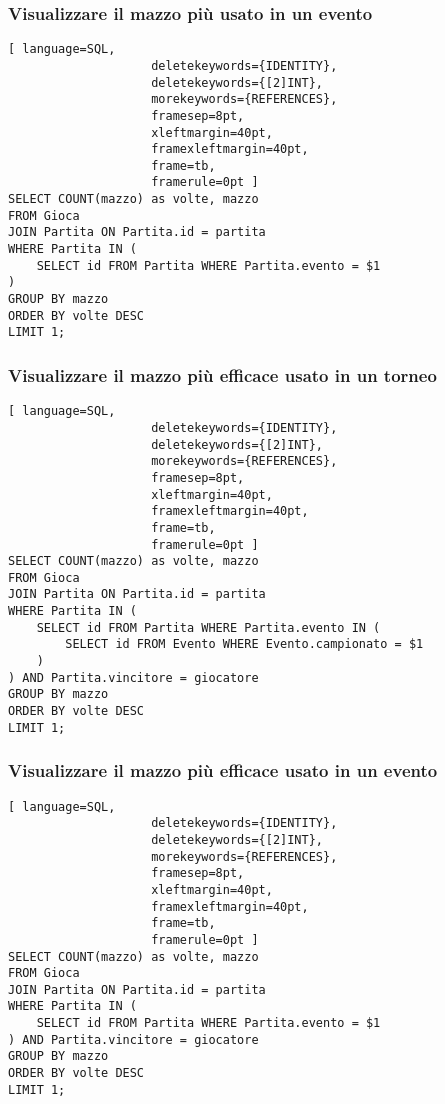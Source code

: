 \documentclass{article}
\begin{document}
\subsubsection{Visualizzare il mazzo più usato in un evento}
\begin{lstlisting}[ language=SQL,
                    deletekeywords={IDENTITY},
                    deletekeywords={[2]INT},
                    morekeywords={REFERENCES},
                    framesep=8pt,
                    xleftmargin=40pt,
                    framexleftmargin=40pt,
                    frame=tb,
                    framerule=0pt ]
SELECT COUNT(mazzo) as volte, mazzo
FROM Gioca 
JOIN Partita ON Partita.id = partita 
WHERE Partita IN (
    SELECT id FROM Partita WHERE Partita.evento = $1
) 
GROUP BY mazzo 
ORDER BY volte DESC 
LIMIT 1;
\end{lstlisting}

\subsubsection{Visualizzare il mazzo più efficace usato in un torneo}
\begin{lstlisting}[ language=SQL,
                    deletekeywords={IDENTITY},
                    deletekeywords={[2]INT},
                    morekeywords={REFERENCES},
                    framesep=8pt,
                    xleftmargin=40pt,
                    framexleftmargin=40pt,
                    frame=tb,
                    framerule=0pt ]
SELECT COUNT(mazzo) as volte, mazzo 
FROM Gioca 
JOIN Partita ON Partita.id = partita 
WHERE Partita IN (
    SELECT id FROM Partita WHERE Partita.evento IN (
        SELECT id FROM Evento WHERE Evento.campionato = $1
    )
) AND Partita.vincitore = giocatore 
GROUP BY mazzo 
ORDER BY volte DESC 
LIMIT 1;
\end{lstlisting}

\subsubsection{Visualizzare il mazzo più efficace usato in un evento}
\begin{lstlisting}[ language=SQL,
                    deletekeywords={IDENTITY},
                    deletekeywords={[2]INT},
                    morekeywords={REFERENCES},
                    framesep=8pt,
                    xleftmargin=40pt,
                    framexleftmargin=40pt,
                    frame=tb,
                    framerule=0pt ]
SELECT COUNT(mazzo) as volte, mazzo 
FROM Gioca 
JOIN Partita ON Partita.id = partita 
WHERE Partita IN (
    SELECT id FROM Partita WHERE Partita.evento = $1
) AND Partita.vincitore = giocatore 
GROUP BY mazzo 
ORDER BY volte DESC 
LIMIT 1;
\end{lstlisting}
\end{document}

